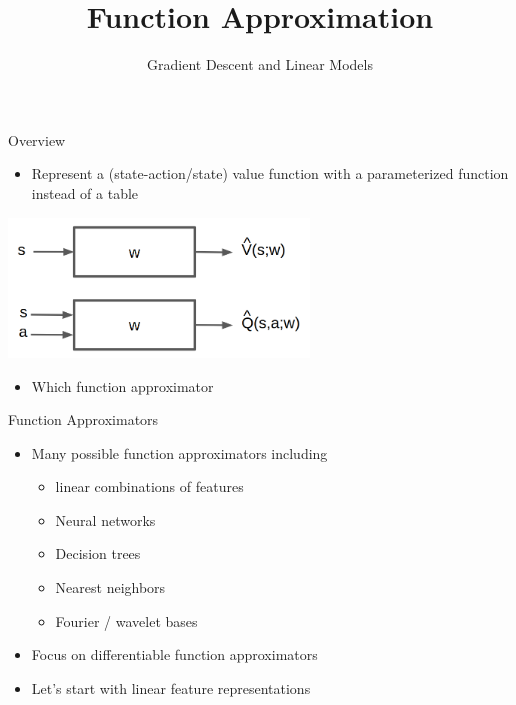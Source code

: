 


\title[Reinforcement Learning: Function Approximation]{Function Approximation}
\subtitle{Gradient Descent and Linear Models}



	
	\maketitle

\begin{frame}[c]{Overview}
	
	
\begin{itemize}
	\item Represent a (state-action/state) value function with a parameterized
	function instead of a table
\end{itemize}

\begin{center}
	\includegraphics[width=0.6\textwidth]{images/vfa.png}
\end{center}

\begin{itemize}
	\item \alert{Which function approximator}
\end{itemize}

\end{frame}
\begin{frame}[c]{Function Approximators}
	
	
	\begin{itemize}
		\item Many possible function approximators including
		\begin{itemize}
			\item linear combinations of features
			\item Neural networks
			\item Decision trees
			\item Nearest neighbors 
			\item Fourier / wavelet bases
		\end{itemize}
		\item Focus on differentiable function approximators
		\item Let's start with linear feature representations
	\end{itemize}
	
\end{frame}
